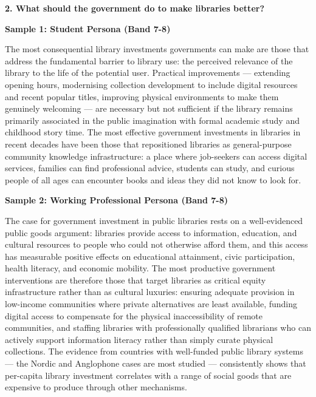 \separator

\begin{ieltsquestion}
\textbf{2. What should the government do to make libraries better?}
\end{ieltsquestion}
\textbf{Sample 1: Student Persona (Band 7-8)}

The most consequential library investments governments can make are those that address the fundamental barrier to library use: the perceived relevance of the library to the life of the potential user. Practical improvements — extending opening hours, modernising collection development to include digital resources and recent popular titles, improving physical environments to make them genuinely welcoming — are necessary but not sufficient if the library remains primarily associated in the public imagination with formal academic study and childhood story time. The most effective government investments in libraries in recent decades have been those that repositioned libraries as general-purpose community knowledge infrastructure: a place where job-seekers can access digital services, families can find professional advice, students can study, and curious people of all ages can encounter books and ideas they did not know to look for.

\textbf{Sample 2: Working Professional Persona (Band 7-8)}

The case for government investment in public libraries rests on a well-evidenced public goods argument: libraries provide access to information, education, and cultural resources to people who could not otherwise afford them, and this access has measurable positive effects on educational attainment, civic participation, health literacy, and economic mobility. The most productive government interventions are therefore those that target libraries as critical equity infrastructure rather than as cultural luxuries: ensuring adequate provision in low-income communities where private alternatives are least available, funding digital access to compensate for the physical inaccessibility of remote communities, and staffing libraries with professionally qualified librarians who can actively support information literacy rather than simply curate physical collections. The evidence from countries with well-funded public library systems — the Nordic and Anglophone cases are most studied — consistently shows that per-capita library investment correlates with a range of social goods that are expensive to produce through other mechanisms.

\separator

